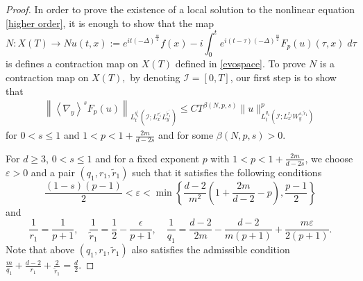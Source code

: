 \documentclass[10pt,a4paper]{amsart}
\begin{document}
	\begin{proof}
		
		 
		In order to prove the existence of a local solution to the nonlinear equation \eqref{higher order}, it is enough to show that the map $$N: X(T)\to Nu(t, x):=e^{i t (-\Delta)^{\frac{m}{2}}} f(x)-i \int_0^t e^{i(t-\tau) (-\Delta)^{\frac{m}{2}}} F_p(u)(\tau, x)\; d \tau$$
		is defines a contraction map on $X(T)$ defined in \eqref{evospace}. To prove $N$ is a contraction map on $X(T),$ by denoting $\mathcal{I}= [0,T]$,  our first step is to show  that
		\begin{align*}
			\left\|\left\langle\nabla_y\right\rangle^s F_p(u)\right\|_{L_t^{q_1^{\prime}}\left(\mathcal{I} ; L_x^{r_1^{\prime}} L_y^{\tilde{r}_1^{\prime}}\right)} \leq C T^{\beta(N, p, s)}\|u\|_{L_t^{q_1}\left(\mathcal{I} ; L_x^{r_1} W_y^{s, \tilde{r}_1}\right)}^p
		\end{align*}
		for $0<s \leq 1$ and $1<p<1+\frac{2m}{d-2s}$ and for  some  $\beta(N, p, s)>0$. 
		
		
		
		For $d \geq 3$, $0<s \leq 1$ and for a fixed exponent $p$ with  $1<p<1+\frac{2m}{d-2s}$, we   choose   $\varepsilon>0$ and  a pair $\left(q_1, r_1, \widetilde{r}_1\right)$ such that it satisfies the following conditions  
		$$
		\frac{(1-s)(p-1)}{2}<\varepsilon<\min \left\{\frac{d-2}{m^2}\left(1+\frac{2m}{d-2}-p\right), \frac{p-1}{2}\right\}
		$$
		and 
		\begin{equation} \label{mxm}
		    \frac{1}{r_1}=\frac{1}{p+1}, \quad \frac{1}{\widetilde{r}_1}=\frac{1}{2}-\frac{\epsilon}{p+1}, \quad \frac{1}{q_1}=\frac{d-2}{2m}-\frac{d-2}{m(p+1)}+\frac{m\varepsilon}{2(p+1)}.
		\end{equation}
		Note that above   $\left(q_1, r_1, \widetilde{r}_1\right)$ also satisfies the admissible condition 	$\frac{{{m}}}{q_1}+\frac{d-2}{r_1}+\frac{2}{\widetilde{r}_1}=\frac{d}{2}.$
        

\end{proof}
\end{document}
